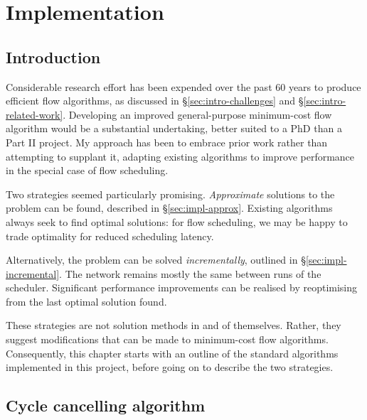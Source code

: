 \chapter{Implementation} \label{chap:impl}


\section{Introduction}

Considerable research effort has been expended over the past 60 years to produce efficient flow algorithms, as discussed in \S\ref{sec:intro-challenges} and \S\ref{sec:intro-related-work}. Developing an improved general-purpose minimum-cost flow algorithm would be a substantial undertaking, better suited to a PhD than a Part II project. My approach has been to embrace prior work rather than attempting to supplant it, adapting existing algorithms to improve performance in the special case of flow scheduling.

Two strategies seemed particularly promising. \emph{Approximate} solutions to the problem can be found, described in \S\ref{sec:impl-approx}. Existing algorithms always seek to find optimal solutions: for flow scheduling, we may be happy to trade optimality for reduced scheduling latency. 

Alternatively, the problem can be solved \emph{incrementally}, outlined in \S\ref{sec:impl-incremental}. The network remains mostly the same between runs of the scheduler. Significant performance improvements can be realised by reoptimising from the last optimal solution found.

These strategies are not solution methods in and of themselves. Rather, they suggest modifications that can be made to minimum-cost flow algorithms. Consequently, this chapter starts with an outline of the standard algorithms implemented in this project, before going on to describe the two strategies.


\section{Cycle cancelling algorithm} \label{sec:impl-cycle-cancelling}


